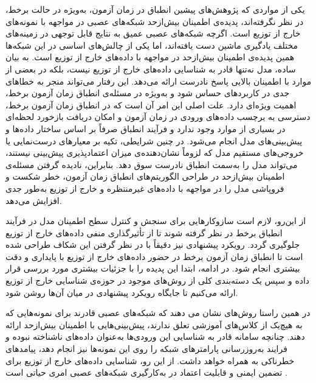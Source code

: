 یکی از مواردی که پژوهش‌های پیشین انطباق در زمان آزمون، به‌ویژه در حالت برخط، در نظر نگرفته‌اند، پدیده‌ی اطمینان بیش‌ازحد شبکه‌های عصبی در مواجهه با نمونه‌های خارج از توزیع است. اگرچه شبکه‌های عصبی عمیق به نتایج قابل توجهی در زمینه‌های مختلف یادگیری ماشین دست یافته‌اند، اما یکی از چالش‌های اساسی در این شبکه‌ها همین پدیده‌ی اطمینان بیش‌ازحد در مواجهه با داده‌های خارج از توزیع است. به بیان ساده، مدل نه‌تنها قادر به شناسایی داده‌های خارج از توزیع نیست، بلکه در بعضی از موارد با اطمینان بالایی پاسخ نادرست ارائه می‌دهد. این رفتار می‌تواند منجر به خطاهای جدی در کاربردهای حساس شود و به‌ویژه در مسئله‌ی انطباق زمان آزمون برخط، 
اهمیت ویژه‌ای دارد.  
علت اصلی این امر آن است که در انطباق زمان آزمون برخط، دسترسی به برچسب داده‌های ورودی در زمان آزمون و امکان دریافت بازخورد لحظه‌ای در بسیاری از موارد وجود ندارد
و فرآیند انطباق صرفاً بر اساس ساختار داده‌ها و پیش‌بینی‌های مدل انجام می‌شود. 
در چنین شرایطی، تکیه بر معیارهای درست‌نمایی یا خروجی‌های مستقیم مدل 
که لزوماً نشان‌دهنده‌ی میزان اعتمادپذیری پیش‌بینی نیستند، 
می‌تواند مدل را به‌سمت انطباق نادرست سوق دهد.  
بنابراین، نادیده گرفتن مسئله‌ی اطمینان بیش‌ازحد در طراحی الگوریتم‌های انطباق زمان آزمون، 
خطر شکست و فروپاشی مدل را در مواجهه با داده‌های غیرمنتظره و خارج از توزیع به‌طور جدی افزایش می‌دهد.  

از این‌رو، لازم است سازوکار‌هایی برای سنجش و کنترل سطح اطمینان مدل در فرآیند انطباق برخط در نظر گرفته شوند 
تا از تأثیرگذاری منفی داده‌های خارج از توزیع جلوگیری گردد. 
رویکرد پیشنهادی  نیز دقیقاً با در نظر گرفتن این شکاف طراحی شده است 
تا انطباق زمان آزمون برخط در حضور داده‌های خارج از توزیع با پایداری و دقت بیشتری انجام شود.
در ادامه، ابتدا این پدیده را با جزئیات بیشتری مورد بررسی قرار داده 
و سپس یک دسته‌بندی کلی از روش‌های موجود در حوزه‌ی شناسایی خارج از توزیع ارائه می‌کنیم 
تا جایگاه رویکرد پیشنهادی در میان آن‌ها روشن شود.


در همین راستا روش‌های \cite{class-ood1, class-ood2, class-ood3}
نشان می دهند که شبکه‌های عصبی قادرند برای نمونه‌هایی که به هیچ‌یک از کلاس‌های آموزشی تعلق ندارند، 
پیش‌بینی‌هایی با اطمینان بیش‌ازحد ارائه دهند. 
چنانچه سامانه قادر به شناسایی این ورودی‌ها به‌عنوان داده‌های ناشناخته نبوده و فرایند به‌روز‌رسانی پارامترهای شبکه را روی این نمونه‌ها نیز انجام دهد، 
پیامدهای خطرناکی به همراه خواهد داشت. از این رو، شناسایی داده‌های خارج از توزیع
برای تضمین ایمنی و قابلیت اعتماد در به‌کارگیری شبکه‌های عصبی امری حیاتی است \cite{ood1, ood2}.

